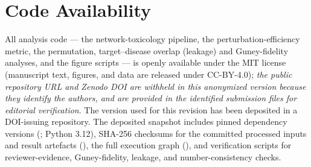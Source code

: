 \section*{Code Availability}

All analysis code --- the network-toxicology pipeline, the perturbation-efficiency
metric, the permutation, target--disease overlap (leakage) and Guney-fidelity
analyses, and the figure scripts --- is openly available under the MIT
license (manuscript text, figures, and data are released under CC-BY-4.0);
\textit{the public repository URL and Zenodo DOI are withheld in this anonymized
version because they identify the authors, and are provided in the identified
submission files for editorial verification}. The
version used for this revision has been deposited in a DOI-issuing repository.
The deposited snapshot includes pinned dependency versions
(; Python 3.12), SHA-256 checksums for the committed processed
inputs and result artefacts (), the full execution graph
(), and verification scripts for reviewer-evidence,
Guney-fidelity, leakage, and number-consistency checks.
